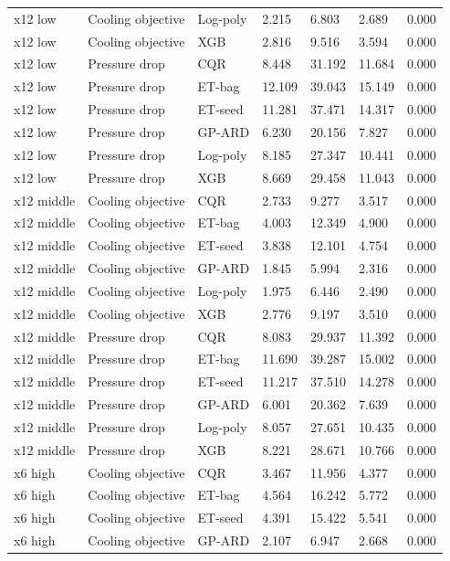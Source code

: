 \begin{longtable}{lllllll}
x12 low & Cooling objective & Log-poly & 2.215 & 6.803 & 2.689 & 0.000\\
x12 low & Cooling objective & XGB & 2.816 & 9.516 & 3.594 & 0.000\\
x12 low & Pressure drop & CQR & 8.448 & 31.192 & 11.684 & 0.000\\
x12 low & Pressure drop & ET-bag & 12.109 & 39.043 & 15.149 & 0.000\\
x12 low & Pressure drop & ET-seed & 11.281 & 37.471 & 14.317 & 0.000\\
x12 low & Pressure drop & GP-ARD & 6.230 & 20.156 & 7.827 & 0.000\\
x12 low & Pressure drop & Log-poly & 8.185 & 27.347 & 10.441 & 0.000\\
x12 low & Pressure drop & XGB & 8.669 & 29.458 & 11.043 & 0.000\\
x12 middle & Cooling objective & CQR & 2.733 & 9.277 & 3.517 & 0.000\\
x12 middle & Cooling objective & ET-bag & 4.003 & 12.349 & 4.900 & 0.000\\
x12 middle & Cooling objective & ET-seed & 3.838 & 12.101 & 4.754 & 0.000\\
x12 middle & Cooling objective & GP-ARD & 1.845 & 5.994 & 2.316 & 0.000\\
x12 middle & Cooling objective & Log-poly & 1.975 & 6.446 & 2.490 & 0.000\\
x12 middle & Cooling objective & XGB & 2.776 & 9.197 & 3.510 & 0.000\\
x12 middle & Pressure drop & CQR & 8.083 & 29.937 & 11.392 & 0.000\\
x12 middle & Pressure drop & ET-bag & 11.690 & 39.287 & 15.002 & 0.000\\
x12 middle & Pressure drop & ET-seed & 11.217 & 37.510 & 14.278 & 0.000\\
x12 middle & Pressure drop & GP-ARD & 6.001 & 20.362 & 7.639 & 0.000\\
x12 middle & Pressure drop & Log-poly & 8.057 & 27.651 & 10.435 & 0.000\\
x12 middle & Pressure drop & XGB & 8.221 & 28.671 & 10.766 & 0.000\\
x6 high & Cooling objective & CQR & 3.467 & 11.956 & 4.377 & 0.000\\
x6 high & Cooling objective & ET-bag & 4.564 & 16.242 & 5.772 & 0.000\\
x6 high & Cooling objective & ET-seed & 4.391 & 15.422 & 5.541 & 0.000\\
x6 high & Cooling objective & GP-ARD & 2.107 & 6.947 & 2.668 & 0.000\\

\end{longtable}
